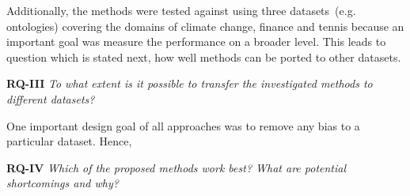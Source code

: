 Additionally, the methods were tested against using three datasets~(e.g. ontologies) covering the domains of climate change, finance and tennis because an important goal was measure the performance on a broader level. This leads to question which is stated next, how well methods can be ported to other datasets. 
 
\textbf{RQ-III} \emph{To what extent is it possible to transfer the investigated methods to different datasets?}

One important design goal of all approaches was to remove any bias to a particular dataset. Hence, 

\textbf{RQ-IV} \emph{Which of the proposed methods work best? What are potential shortcomings and why?}


